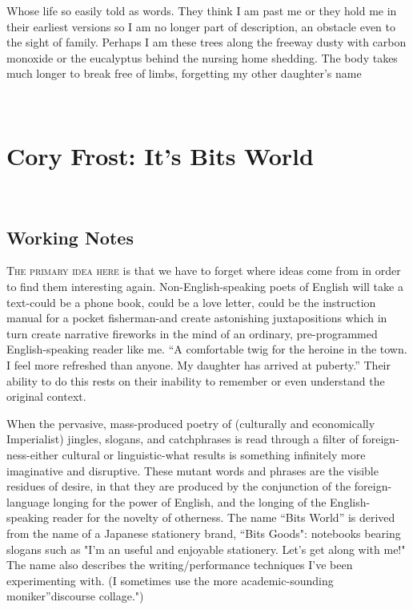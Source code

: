 \documentclass[
]{memoir}
\begin{document}
Whose life so easily told as words. They think I am past me or they hold
me in their earliest versions so I am no longer part of description, an
obstacle even to the sight of family. Perhaps I am these trees along the
freeway dusty with carbon monoxide or the eucalyptus behind the nursing
home shedding. The body takes much longer to break free of limbs,
forgetting my other daughter's name

~

\hypertarget{cory-frost-its-bits-world}{%
\chapter{Cory Frost: It's Bits World}\label{cory-frost-its-bits-world}}

~

\hypertarget{working-notes-2}{%
\section*{Working Notes}\label{working-notes-2}}

\lettrine[lines=3, findent=0em, nindent=0.1em, lhang=0]{T}{he primary idea here}
is that we have to forget where ideas come from in order to find them
interesting again. Non-English-speaking poets of English will take a
text-could be a phone book, could be a love letter, could be the
instruction manual for a pocket fisherman-and create astonishing
juxtapositions which in turn create narrative fireworks in the mind of
an ordinary, pre-programmed English-speaking reader like me. ``A
comfortable twig for the heroine in the town. I feel more refreshed than
anyone. My daughter has arrived at puberty.'' Their ability to do this
rests on their inability to remember or even understand the original
context.

When the pervasive, mass-produced poetry of (culturally and economically
Imperialist) jingles, slogans, and catchphrases is read through a filter
of foreign-ness-either cultural or linguistic-what results is something
infinitely more imaginative and disruptive. These mutant words and
phrases are the visible residues of desire, in that they are produced by
the conjunction of the foreign-language longing for the power of
English, and the longing of the English-speaking reader for the novelty
of otherness. The name ``Bits World'' is derived from the name of a
Japanese stationery brand, ``Bits Goods": notebooks bearing slogans such
as "I'm an useful and enjoyable stationery. Let's get along with me!"
The name also describes the writing/performance techniques I've been
experimenting with. (I sometimes use the more academic-sounding
moniker''discourse collage.")
\end{document}
